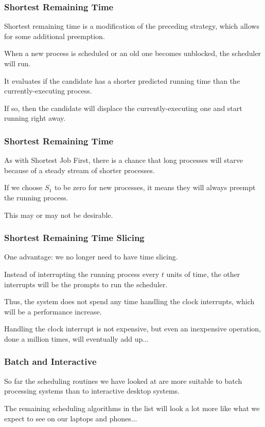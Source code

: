 \begin{frame}
\frametitle{Shortest Remaining Time}

Shortest remaining time is a modification of the preceding strategy, which allows for some additional preemption. 

When a new process is scheduled or an old one becomes unblocked, the scheduler will run.

It evaluates if the candidate has a shorter predicted running time than the currently-executing process. 

If so, then the candidate will displace the currently-executing one and start running right away.


\end{frame}

\begin{frame}
\frametitle{Shortest Remaining Time}

As with Shortest Job First, there is a chance that long processes will starve because of a steady stream of shorter processes. 

If we choose $S_{1}$ to be zero for new processes, it means they will always preempt the running process. 

This may or may not be desirable.


\end{frame}

\begin{frame}
\frametitle{Shortest Remaining Time Slicing}

One advantage: we no longer need to have time slicing. 

Instead of interrupting the running process every $t$ units of time, the other interrupts will be the prompts to run the scheduler. 

Thus, the system does not spend any time handling the clock interrupts, which will be a performance increase. 

Handling the clock interrupt is not expensive, but even an inexpensive operation, done a million times, will eventually add up...


\end{frame}



\begin{frame}
\frametitle{Batch and Interactive}

So far the scheduling routines we have looked at are more suitable to batch processing systems than to interactive desktop systems. 

The remaining scheduling algorithms in the list will look a lot more like what we expect to see on our laptops and phones...


\end{frame}



